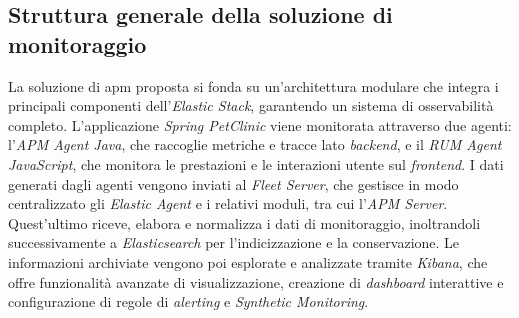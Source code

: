 \subsection{Struttura generale della soluzione di monitoraggio}
La soluzione di \gls{apm} proposta si fonda su un'architettura modulare che integra i principali componenti dell'\emph{Elastic Stack}, garantendo un sistema di osservabilità completo.  
L'applicazione \emph{Spring PetClinic} viene monitorata attraverso due agenti: l'\emph{APM Agent Java}, che raccoglie metriche e tracce lato \emph{backend}, e il \emph{RUM Agent JavaScript}, che monitora le prestazioni e le interazioni utente sul \emph{frontend}.  
I dati generati dagli agenti vengono inviati al \emph{Fleet Server}, che gestisce in modo centralizzato gli \emph{Elastic Agent} e i relativi moduli, tra cui l'\emph{APM Server}.  
Quest'ultimo riceve, elabora e normalizza i dati di monitoraggio, inoltrandoli successivamente a \emph{Elasticsearch} per l'indicizzazione e la conservazione.  
Le informazioni archiviate vengono poi esplorate e analizzate tramite \emph{Kibana}, che offre funzionalità avanzate di visualizzazione, creazione di \emph{dashboard} interattive e configurazione di regole di \emph{alerting} e \emph{Synthetic Monitoring}.  


